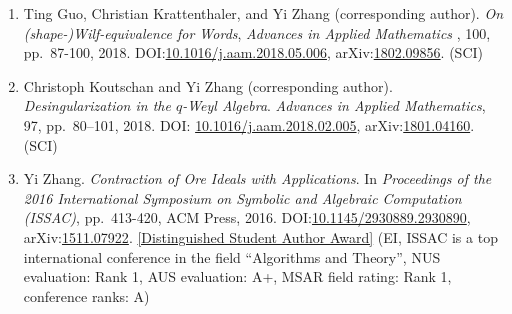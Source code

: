 \documentclass[a4paper,12pt]{article}
\begin{document}
\begin{enumerate}
 {\em  Journal of Symbolic Computation},  95, pp.\ 217-237, 2019. DOI:\href{https://doi.org/10.1016/j.jsc.2019.02.009}{10.1016/j.jsc.2019.02.009}, arXiv:\href{http://arxiv.org/abs/1705.00838}{1705.00838}. (SCI)
\item Ting Guo, Christian Krattenthaler, and Yi Zhang (corresponding author).
{\em On (shape-)Wilf-equivalence for Words}, 
{\em  Advances in Applied Mathematics} , 100, pp.\ 87-100, 2018. 
DOI:\href{https://doi.org/10.1016/j.aam.2018.05.006}{10.1016/j.aam.2018.05.006}, 
arXiv:\href{https://arxiv.org/pdf/1802.09856.pdf}{1802.09856}. (SCI)
\item Christoph Koutschan and Yi Zhang (corresponding author). {\em Desingularization in the $q$-Weyl Algebra}. 
{\em Advances in Applied Mathematics}, 97, pp.\ 80–101, 2018. 
DOI: \href{http://dx.doi.org/10.1016/j.aam.2018.02.005}{10.1016/j.aam.2018.02.005},
arXiv:\href{https://arxiv.org/abs/1801.04160}{1801.04160}. (SCI) 
\item Yi Zhang. {\em Contraction of Ore Ideals with Applications}. 
In {\em Proceedings of the 2016 International Symposium on Symbolic and Algebraic Computation (ISSAC)}, 
pp.\ 413-420, ACM Press, 2016. DOI:\href{http://dl.acm.org/citation.cfm?id=2930890}{10.1145/2930889.2930890},
arXiv:\href{https://arxiv.org/abs/1511.07922}{1511.07922}. 
\href{https://www.sigsam.org/Awards/ISSACAwards.html}{[Distinguished Student Author Award]} 
(EI, ISSAC is a top international conference in the field ``Algorithms and Theory'', NUS evaluation: Rank 1, AUS evaluation: A+, MSAR field rating: Rank 1, conference ranks: A) 
\end{enumerate}
\end{document}
